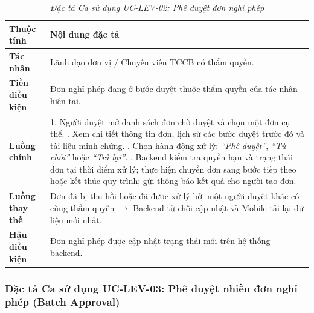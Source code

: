 \begin{table}[H]
\centering
\renewcommand{\arraystretch}{1.25}
\begin{tabularx}{\textwidth}{|p{3.2cm}|X|}
\hline
\textbf{Thuộc tính} & \textbf{Nội dung đặc tả} \\
\hline
\textbf{Tác nhân} & Lãnh đạo đơn vị / Chuyên viên TCCB có thẩm quyền. \\
\hline
\textbf{Tiền điều kiện} & Đơn nghỉ phép đang ở bước duyệt thuộc thẩm quyền của tác nhân hiện tại. \\
\hline
\textbf{Luồng chính} & 
1. Người duyệt mở danh sách đơn chờ duyệt và chọn một đơn cụ thể. \newline
2. Xem chi tiết thông tin đơn, lịch sử các bước duyệt trước đó và tài liệu minh chứng. \newline
3. Chọn hành động xử lý: \textit{``Phê duyệt''}, \textit{``Từ chối''} hoặc \textit{``Trả lại''}. \newline
4. Backend kiểm tra quyền hạn và trạng thái đơn tại thời điểm xử lý; thực hiện chuyển đơn sang bước tiếp theo hoặc kết thúc quy trình; gửi thông báo kết quả cho người tạo đơn. \\
\hline
\textbf{Luồng thay thế} & Đơn đã bị thu hồi hoặc đã được xử lý bởi một người duyệt khác có cùng thẩm quyền $\rightarrow$ Backend từ chối cập nhật và Mobile tải lại dữ liệu mới nhất. \\
\hline
\textbf{Hậu điều kiện} & Đơn nghỉ phép được cập nhật trạng thái mới trên hệ thống backend. \\
\hline
\end{tabularx}
\caption{\textit{Đặc tả Ca sử dụng UC-LEV-02: Phê duyệt đơn nghỉ phép}}
\label{tab:uc_lev_02}
\end{table}

\subsubsection{Đặc tả Ca sử dụng UC-LEV-03: Phê duyệt nhiều đơn nghỉ phép (Batch Approval)}

